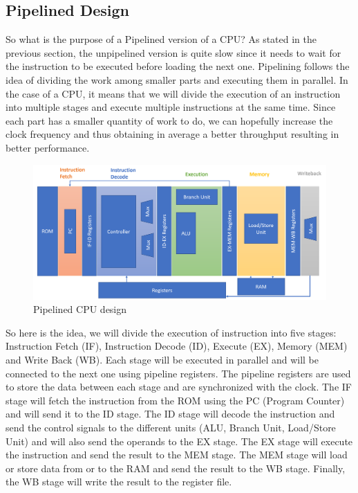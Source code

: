 \subsection{Pipelined Design}
So what is the purpose of a Pipelined version of a CPU\@? As stated in the previous section, the unpipelined version is quite slow since it needs to wait for the instruction to be executed before loading the next one. 
Pipelining follows the idea of dividing the work among smaller parts and executing them in parallel. In the case of a CPU, it means that we will divide the execution of an instruction into multiple stages and execute multiple instructions at the same time.
Since each part has a smaller quantity of work to do, we can hopefully increase the clock frequency and thus obtaining in average a better throughput resulting in better performance.

\begin{figure}[H]
    \centering
    \includegraphics[width=1\textwidth]{design/pipelined/images/pipelined_design.png}
    \caption{Pipelined CPU design}
    \label{fig:pipelined_cpu_design}
\end{figure}

So here is the idea, we will divide the execution of instruction into five stages: Instruction Fetch (IF), Instruction Decode (ID), Execute (EX), Memory (MEM) and Write Back (WB).
Each stage will be executed in parallel and will be connected to the next one using pipeline registers. The pipeline registers are used to store the data between each stage and are synchronized with the clock.
The IF stage will fetch the instruction from the ROM using the PC (Program Counter) and will send it to the ID stage. The ID stage will decode the instruction and send the control signals to the different units 
(ALU, Branch Unit, Load/Store Unit) and will also send the operands to the EX stage. The EX stage will execute the instruction and send the result to the MEM stage. 
The MEM stage will load or store data from or to the RAM and send the result to the WB stage. Finally, the WB stage will write the result to the register file. \\

